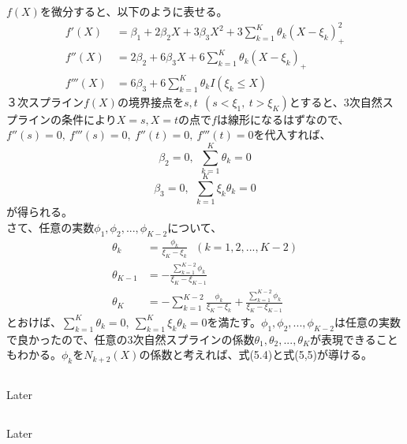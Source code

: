 \documentclass{jsarticle}
\begin{document}
$f(X)$を微分すると、以下のように表せる。
\begin{align*}
f'(X)&=\beta_1+2\beta_2 X+3\beta_3 X^2+3\sum_{k=1}^{K}\theta_k(X-\xi_k)_+^2\\
f''(X)&=2\beta_2 +6\beta_3 X+6\sum_{k=1}^{K}\theta_k(X-\xi_k)_+\\
f'''(X)&=6\beta_3+6\sum_{k=1}^{K}\theta_k I(\xi_k\leq X)
\end{align*}
３次スプライン$f(X)$の境界接点を$s,t\ \ (s<\xi_1,\ t>\xi_K)$とすると、3次自然スプラインの条件により$X=s, X=t$の点で$f$は線形になるはずなので、$f''(s)=0,\ f'''(s)=0,\ f''(t)=0,\ f'''(t)=0$を代入すれば、
\[\beta_2=0,\ \ \sum_{k=1}^{K}\theta_k=0\]
\[\beta_3=0,\ \ \sum_{k=1}^{K}\xi_k\theta_k=0\]
が得られる。\\
さて、任意の実数$\phi_1,\phi_2,...,\phi_{K-2}$について、
\begin{align*}
\theta_k&=\frac{\phi_k}{\xi_K-\xi_k}\ \ \ (k=1,2,...,K-2)\\
\theta_{K-1}&=-\frac{\sum_{k=1}^{K-2}\phi_k}{\xi_K-\xi_{K-1}}\\
\theta_K&=-\sum_{k=1}^{K-2}\frac{\phi_k}{\xi_K-\xi_k}+\frac{\sum_{k=1}^{K-2}\phi_k}{\xi_K-\xi_{K-1}}
\end{align*}
とおけば、$\sum_{k=1}^{K}\theta_k=0,\ \sum_{k=1}^{K}\xi_k\theta_k=0$を満たす。$\phi_1,\phi_2,...,\phi_{K-2}$は任意の実数で良かったので、任意の3次自然スプラインの係数$\theta_1,\theta_2,...,\theta_K$が表現できることもわかる。$\phi_k$を$N_{k+2}(X)$の係数と考えれば、式(5.4)と式(5,5)が導ける。


\subsection{}
Later
\subsection{}
Later

\end{document}
